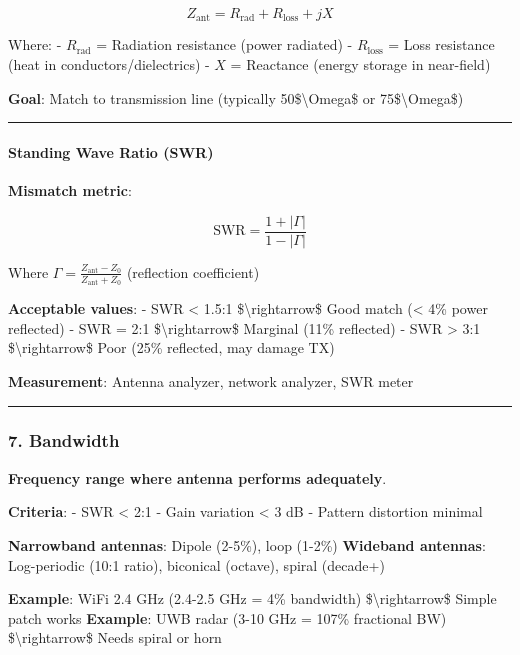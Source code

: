 \[
Z_{\text{ant}} = R_{\text{rad}} + R_{\text{loss}} + jX
\]

Where: - \(R_{\text{rad}}\) = Radiation resistance (power radiated) -
\(R_{\text{loss}}\) = Loss resistance (heat in conductors/dielectrics) -
\(X\) = Reactance (energy storage in near-field)

\textbf{Goal}: Match to transmission line (typically
50\$\textbackslash Omega\$ or 75\$\textbackslash Omega\$)

\begin{center}\rule{0.5\linewidth}{0.5pt}\end{center}

\paragraph{Standing Wave Ratio (SWR)}\label{standing-wave-ratio-swr}

\textbf{Mismatch metric}:

\[
\text{SWR} = \frac{1 + |\Gamma|}{1 - |\Gamma|}
\]

Where \(\Gamma = \frac{Z_{\text{ant}} - Z_0}{Z_{\text{ant}} + Z_0}\)
(reflection coefficient)

\textbf{Acceptable values}: - SWR \textless{} 1.5:1
\$\textbackslash rightarrow\$ Good match (\textless{} 4\% power
reflected) - SWR = 2:1 \$\textbackslash rightarrow\$ Marginal (11\%
reflected) - SWR \textgreater{} 3:1 \$\textbackslash rightarrow\$ Poor
(25\% reflected, may damage TX)

\textbf{Measurement}: Antenna analyzer, network analyzer, SWR meter

\begin{center}\rule{0.5\linewidth}{0.5pt}\end{center}

\subsubsection{7. Bandwidth}\label{bandwidth}

\textbf{Frequency range where antenna performs adequately}.

\textbf{Criteria}: - SWR \textless{} 2:1 - Gain variation \textless{} 3
dB - Pattern distortion minimal

\textbf{Narrowband antennas}: Dipole (2-5\%), loop (1-2\%)
\textbf{Wideband antennas}: Log-periodic (10:1 ratio), biconical
(octave), spiral (decade+)

\textbf{Example}: WiFi 2.4 GHz (2.4-2.5 GHz = 4\% bandwidth)
\$\textbackslash rightarrow\$ Simple patch works \textbf{Example}: UWB
radar (3-10 GHz = 107\% fractional BW) \$\textbackslash rightarrow\$
Needs spiral or horn

